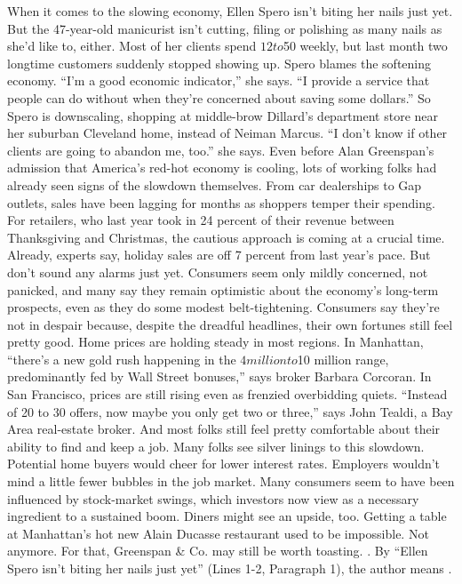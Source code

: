 {{{{{{{{{When it comes to the slowing economy, Ellen Spero isn’t biting her nails just yet. But the 47-year-old manicurist isn’t cutting, filing or polishing as many nails as she’d like to, either. Most of her clients spend $12 to $50 weekly, but last month two longtime customers suddenly stopped showing up. Spero blames the softening economy. “I’m a good economic indicator,” she says. “I provide a service that people can do without when they’re concerned about saving some dollars.” So Spero is downscaling, shopping at middle-brow Dillard’s department store near her suburban Cleveland home, instead of Neiman Marcus. “I don’t know if other clients are going to abandon me, too.” she says.
Even before Alan Greenspan’s admission that America’s red-hot economy is cooling, lots of working folks had already seen signs of the slowdown themselves. From car dealerships to Gap outlets, sales have been lagging for months as shoppers temper their spending. For retailers, who last year took in 24 percent of their revenue between Thanksgiving and Christmas, the cautious approach is coming at a crucial time. Already, experts say, holiday sales are off 7 percent from last year’s pace. But don’t sound any alarms just yet. Consumers seem only mildly concerned, not panicked, and many say they remain optimistic about the economy’s long-term prospects, even as they do some modest belt-tightening.
Consumers say they’re not in despair because, despite the dreadful headlines, their own fortunes still feel pretty good. Home prices are holding steady in most regions. In Manhattan, “there’s a new gold rush happening in the $4 million to $10 million range, predominantly fed by Wall Street bonuses,” says broker Barbara Corcoran. In San Francisco, prices are still rising even as frenzied overbidding quiets. “Instead of 20 to 30 offers, now maybe you only get two or three,” says John Tealdi, a Bay Area real-estate broker. And most folks still feel pretty comfortable about their ability to find and keep a job.
Many folks see silver linings to this slowdown. Potential home buyers would cheer for lower interest rates. Employers wouldn’t mind a little fewer bubbles in the job market. Many consumers seem to have been influenced by stock-market swings, which investors now view as a necessary ingredient to a sustained boom. Diners might see an upside, too. Getting a table at Manhattan’s hot new Alain Ducasse restaurant used to be impossible. Not anymore. For that, Greenspan & Co. may still be worth toasting.
 .	By “Ellen Spero isn’t biting her nails just yet” (Lines 1-2, Paragraph 1), the author means \ltk{}.\\
}}}}}}}}}
